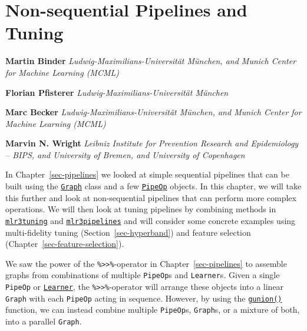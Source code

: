 \hypertarget{sec-pipelines-nonseq}{%
\chapter{Non-sequential Pipelines and Tuning}\label{sec-pipelines-nonseq}}

\vspace{-15mm}

\textbf{Martin Binder} \newline  \emph{Ludwig-Maximilians-Universität
München, and Munich Center for Machine Learning (MCML)}

\textbf{Florian Pfisterer} \newline 
\emph{Ludwig-Maximilians-Universität München}

\textbf{Marc Becker} \newline  \emph{Ludwig-Maximilians-Universität
München, and Munich Center for Machine Learning (MCML)}

\textbf{Marvin N. Wright} \newline  \emph{Leibniz Institute for
Prevention Research and Epidemiology -- BIPS, and University of Bremen,
and University of Copenhagen} \newline \newline 

In Chapter~\ref{sec-pipelines} we looked at simple sequential pipelines
that can be built using the
\href{https://mlr3pipelines.mlr-org.com/reference/Graph.html}{\texttt{Graph}}
class and a few
\href{https://mlr3pipelines.mlr-org.com/reference/PipeOp.html}{\texttt{PipeOp}}
objects. In this chapter, we will take this further and look at
non-sequential pipelines that can perform more complex operations. We
will then look at tuning pipelines by combining methods in
\href{https://mlr3tuning.mlr-org.com}{\texttt{mlr3tuning}}
and
\href{https://mlr3pipelines.mlr-org.com}{\texttt{mlr3pipelines}}
and will consider some concrete examples using multi-fidelity tuning
(Section~\ref{sec-hyperband}) and feature selection
(Chapter~\ref{sec-feature-selection}).

We saw the power of the
\texttt{\%\textgreater{}\textgreater{}\%}-operator in
Chapter~\ref{sec-pipelines} to assemble graphs from combinations of
multiple \texttt{PipeOp}s and \texttt{Learner}s. Given a single
\texttt{PipeOp} or
\href{https://mlr3.mlr-org.com/reference/Learner.html}{\texttt{Learner}},
the \texttt{\%\textgreater{}\textgreater{}\%}-operator will arrange
these objects into a linear \texttt{Graph} with each \texttt{PipeOp}
acting in sequence. However, by using the
\href{https://mlr3pipelines.mlr-org.com/reference/gunion.html}{\texttt{gunion()}}
function, we can instead combine multiple \texttt{PipeOp}s,
\texttt{Graph}s, or a mixture of both, into a parallel \texttt{Graph}.

